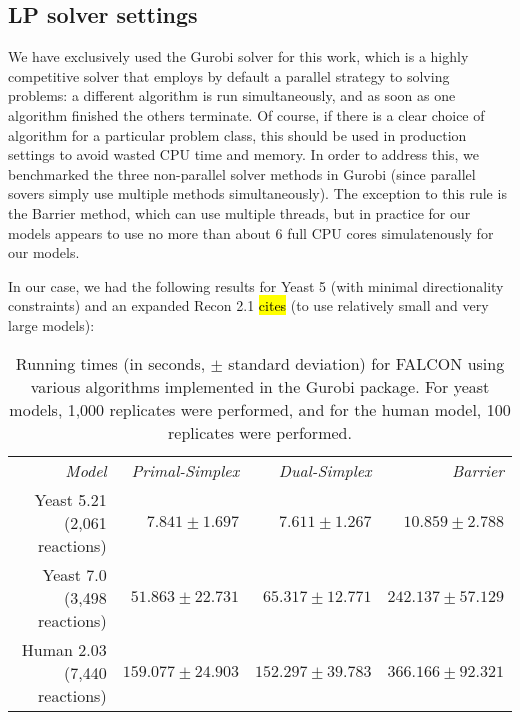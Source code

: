 \subsection{LP solver settings}
We have exclusively used the Gurobi solver \citep{gurobi} for this
work, which is a highly competitive solver that employs by default a
parallel strategy to solving problems: a different algorithm is run
simultaneously, and as soon as one algorithm finished the others
terminate. Of course, if there is a clear choice of algorithm for a
particular problem class, this should be used in production settings
to avoid wasted CPU time and memory. In order to address this, we
benchmarked the three non-parallel solver methods in Gurobi
 (since parallel sovers simply use multiple methods simultaneously).
The exception to this rule is the Barrier method, which can use
multiple threads, but in practice for our models appears to use
no more than about 6 full CPU cores simulatenously for our models.

In our case, we had the following results for Yeast 5 (with minimal
directionality constraints) and an expanded
Recon 2.1 \hl{cites} (to use relatively small and very large models):

\begin{table}
\begin{center}
\begin{tabular}{rrrr}
\emph{Model}                 & \emph{Primal-Simplex} & \emph{Dual-Simplex} & \emph{Barrier} \\
Yeast 5.21 (2,061 reactions) & $ 7.841 \pm 1.697    $ & $ 7.611 \pm 1.267    $ & $ 10.859 \pm 2.788   $\\ 
Yeast 7.0 (3,498 reactions)  & $ 51.863 \pm 22.731  $ & $ 65.317 \pm 12.771  $ & $ 242.137 \pm 57.129 $\\
Human 2.03 (7,440 reactions) & $ 159.077 \pm 24.903 $ & $ 152.297 \pm 39.783 $ & $ 366.166 \pm 92.321 $\\
\end{tabular}
\end{center}
\caption{Running times (in seconds, $\pm$ standard deviation) for
  FALCON using various algorithms implemented in the Gurobi package.
  For yeast models, 1,000 replicates were performed, and for the human
  model, 100 replicates were performed.}
\label{tab:methodTime}
\end{table}

